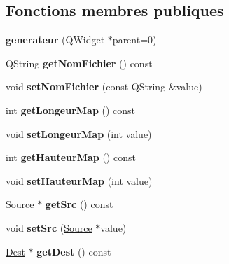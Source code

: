 \subsection*{Fonctions membres publiques}
\begin{DoxyCompactItemize}
\item 
\mbox{\label{classgenerateur_a6eb93aa39612bb7ead238b461de1b7a7}} 
{\bfseries generateur} (Q\+Widget $\ast$parent=0)
\item 
\mbox{\label{classgenerateur_a525e3cb18ed1f824f01f69d62de8a5f9}} 
Q\+String {\bfseries get\+Nom\+Fichier} () const
\item 
\mbox{\label{classgenerateur_ac42bbd1887373275def075267fc4a337}} 
void {\bfseries set\+Nom\+Fichier} (const Q\+String \&value)
\item 
\mbox{\label{classgenerateur_a9de5bdc46e6e83da76828f7436558cd2}} 
int {\bfseries get\+Longeur\+Map} () const
\item 
\mbox{\label{classgenerateur_ad56dcbcb85529698c1ccb0d5df6d7099}} 
void {\bfseries set\+Longeur\+Map} (int value)
\item 
\mbox{\label{classgenerateur_a7efe0a6c5932ccb0b7c3a00d22ac129f}} 
int {\bfseries get\+Hauteur\+Map} () const
\item 
\mbox{\label{classgenerateur_aea182767e2055626fa1eac447535c8e2}} 
void {\bfseries set\+Hauteur\+Map} (int value)
\item 
\mbox{\label{classgenerateur_a4d4c05a0e38e0a012a6d84c215da1d9d}} 
\mbox{\hyperlink{class_source}{Source}} $\ast$ {\bfseries get\+Src} () const
\item 
\mbox{\label{classgenerateur_a6114fdb34fe1fbb01dc771edeea11db8}} 
void {\bfseries set\+Src} (\mbox{\hyperlink{class_source}{Source}} $\ast$value)
\item 
\mbox{\label{classgenerateur_a0ce57d69fdcf929f50a59b0cd014598a}} 
\mbox{\hyperlink{class_dest}{Dest}} $\ast$ {\bfseries get\+Dest} () const

\end{DoxyCompactItemize}
